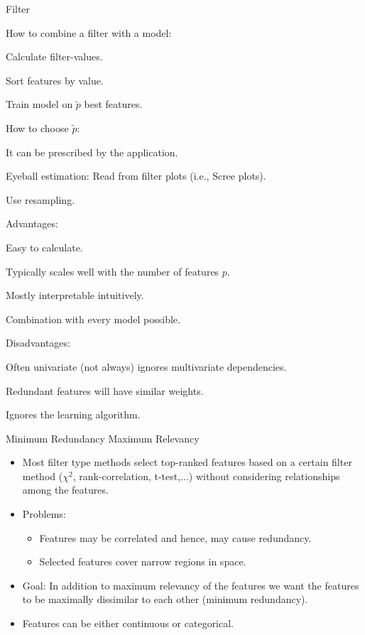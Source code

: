 \documentclass[11pt,compress,t,notes=noshow, xcolor=table]{beamer}
\begin{document}
  \begin{vbframe}{Filter}
  \begin{blocki}{How to combine a filter with a model:}
    \item Calculate filter-values.
    \item Sort features by value.
    \item Train model on $\tilde{p}$ best features.
  \end{blocki}

  \lz

  \begin{blocki}{How to choose $\tilde{p}$:}
    \item It can be prescribed by the application.
    \item Eyeball estimation: Read from filter plots (i.e., Scree plots).
    \item Use resampling.
  \end{blocki}

  \framebreak

  \begin{blocki}{Advantages:}
    \item Easy to calculate.
    \item Typically scales well with the number of features $p$.
    \item Mostly interpretable intuitively.
    \item Combination with every model possible.
  \end{blocki}

  \begin{blocki}{Disadvantages:}
    \item Often univariate (not always) ignores multivariate dependencies.
    \item Redundant features will have similar weights.
    \item Ignores the learning algorithm.
  \end{blocki}
  \end{vbframe}

  \begin{vbframe}{Minimum Redundancy Maximum Relevancy}
  \begin{itemize}
    \item Most filter type methods select top-ranked features based on a certain filter method ($\chi^2$, rank-correlation, t-test,...) without considering relationships among the features.
    \item Problems:
    \begin{itemize}
    \item Features may be correlated and hence, may cause redundancy.
    \item Selected features cover narrow regions in space.
    \end{itemize}
    \item Goal: In addition to maximum relevancy of the features we want the features to be maximally dissimilar to each other (minimum redundancy).
    \item Features can be either continuous or categorical.
  \end{itemize}
  \end{vbframe}
\end{document}
